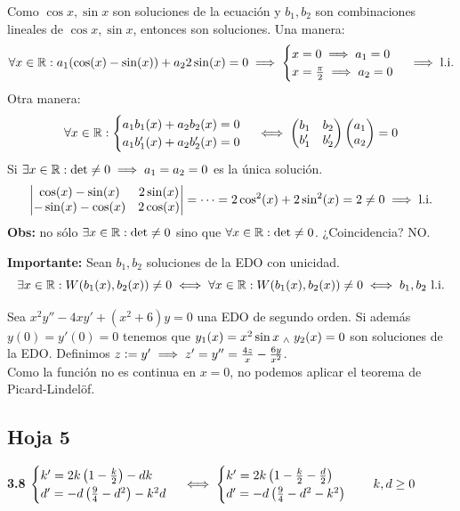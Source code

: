 Como $\cos{x}, \sin{x}$ son soluciones de la ecuación y $b_1, b_2$ son combinaciones lineales de $\cos{x}, \sin{x}$, entonces son soluciones.
Una manera: \[\forall x \in \mathbb{R} : a_1(\cos(x) - \sin(x)) + a_2 2 \sin(x) = 0 \implies \begin{cases}
		x= 0 \implies a_1 = 0 \\
		x= \frac{\pi}{2} \implies a_2 = 0
	\end{cases}\implies \text{l.i.}\]
Otra manera:
\[\forall x \in \mathbb{R} : \begin{cases}
		a_1b_1(x) + a_2b_2(x) = 0 \\
		a_1b_1'(x) + a_2b_2'(x) = 0
	\end{cases} \iff \begin{pmatrix}
		b_1  & b_2  \\
		b_1' & b_2'
	\end{pmatrix} \begin{pmatrix}
		a_1 \\
		a_2
	\end{pmatrix} = 0\]
Si $\exists x \in \mathbb{R} : \det \neq 0 \implies a_1 = a_2 = 0$ es la única solución.
\[\begin{vmatrix}
		\cos(x) - \sin(x)  & 2\sin(x) \\
		-\sin(x) - \cos(x) & 2\cos(x)
	\end{vmatrix} = \cdots = 2\cos^2(x) + 2\sin^2(x) = 2 \neq 0 \implies \text{l.i.}\]
\textbf{Obs:} no sólo $\exists x\in \mathbb{R} : \det \neq 0$ sino que $\forall x \in \mathbb{R} : \det \neq 0$. ¿Coincidencia? NO.

\textbf{Importante:} Sean $b_1, b_2$ soluciones de la EDO con unicidad.
\[\exists x \in \mathbb{R} : W(b_1(x), b_2(x)) \neq 0 \iff \forall x \in \mathbb{R} : W(b_1(x), b_2(x)) \neq 0 \iff b_1, b_2 \text{ l.i.}\]

Sea $x^2y'' - 4xy'+(x^2+6)y = 0$ una EDO de segundo orden. Si además $y(0) = y'(0) = 0$ tenemos que $y_1(x)=x^2\sin{x} \; _{\wedge} \; y_2(x)= 0$ son soluciones de la EDO. Definimos $z\vcentcolon= y' \implies z' = y'' = \frac{4z}{x} - \frac{6y}{x^2}$.\\

Como la función no es continua en $x=0$, no podemos aplicar el teorema de Picard-Lindelöf.


\subsection{Hoja 5}

\textbf{3.8} $\displaystyle \begin{cases}
		k' = 2k\left(1-\frac{k}{2}\right) - dk \\
		d' = -d\left(\frac{9}{4} - d^2\right) -k^2d
	\end{cases} \iff \begin{cases}
		k' = 2k\left(1-\frac{k}{2} - \frac{d}{2}\right) \\
		d' = -d\left(\frac{9}{4} - d^2 - k^2\right)
	\end{cases} \quad k,d \geq 0$

